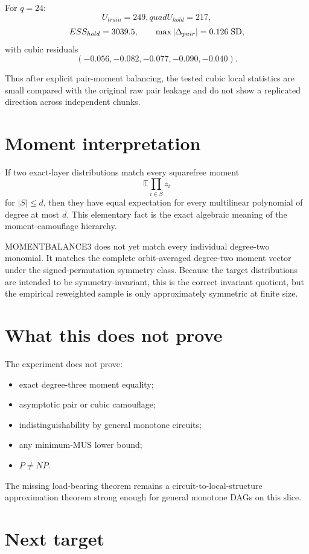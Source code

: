 \documentclass[11pt]{article}
\begin{document}
For \(q=24\):
\[
U_{train}=249,quad U_{hold}=217,
\]
\[
ESS_{hold}=3039.5,
\qquad
\max|\Delta_{pair}|=0.126\;{\rm SD},
\]
with cubic residuals
\[
(-0.056,-0.082,-0.077,-0.090,-0.040).
\]

Thus after explicit pair-moment balancing, the tested cubic local statistics
are small compared with the original raw pair leakage and do not show a
replicated direction across independent chunks.

\section{Moment interpretation}

If two exact-layer distributions match every squarefree moment
\[
\mathbb E\prod_{i\in S}z_i
\]
for \(|S|\le d\), then they have equal expectation for every multilinear
polynomial of degree at most \(d\).  This elementary fact is the exact
algebraic meaning of the moment-camouflage hierarchy.

MOMENTBALANCE3 does not yet match every individual degree-two monomial.
It matches the complete orbit-averaged degree-two moment vector under the
signed-permutation symmetry class.  Because the target distributions are
intended to be symmetry-invariant, this is the correct invariant quotient,
but the empirical reweighted sample is only approximately symmetric at
finite size.

\section{What this does not prove}

The experiment does not prove:
\begin{itemize}
\item exact degree-three moment equality;
\item asymptotic pair or cubic camouflage;
\item indistinguishability by general monotone circuits;
\item any minimum-MUS lower bound;
\item \(P\ne NP\).
\end{itemize}

The missing load-bearing theorem remains a circuit-to-local-structure
approximation theorem strong enough for general monotone DAGs on this slice.

\section{Next target}
\end{document}
